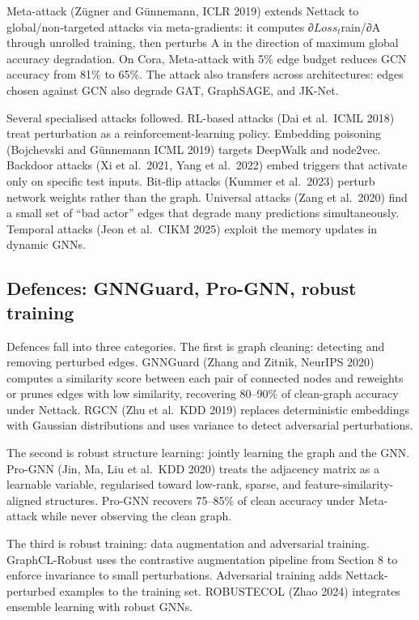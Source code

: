 Meta-attack (Zügner and Günnemann, ICLR 2019) extends Nettack to global/non-targeted attacks via meta-gradients: it computes ∂\(Loss_t\)rain/∂A through unrolled training, then perturbs A in the direction of maximum global accuracy degradation. On Cora, Meta-attack with 5\% edge budget reduces GCN accuracy from 81\% to 65\%. The attack also transfers across architectures: edges chosen against GCN also degrade GAT, GraphSAGE, and JK-Net.

Several specialised attacks followed. RL-based attacks (Dai et al.~ICML 2018) treat perturbation as a reinforcement-learning policy. Embedding poisoning (Bojchevski and Günnemann ICML 2019) targets DeepWalk and node2vec. Backdoor attacks (Xi et al.~2021, Yang et al.~2022) embed triggers that activate only on specific test inputs. Bit-flip attacks (Kummer et al.~2023) perturb network weights rather than the graph. Universal attacks (Zang et al.~2020) find a small set of ``bad actor'' edges that degrade many predictions simultaneously. Temporal attacks (Jeon et al.~CIKM 2025) exploit the memory updates in dynamic GNNs.

\subsection{Defences: GNNGuard, Pro-GNN, robust training}\label{defences-gnnguard-pro-gnn-robust-training}

Defences fall into three categories. The first is graph cleaning: detecting and removing perturbed edges. GNNGuard (Zhang and Zitnik, NeurIPS 2020) computes a similarity score between each pair of connected nodes and reweights or prunes edges with low similarity, recovering 80--90\% of clean-graph accuracy under Nettack. RGCN (Zhu et al.~KDD 2019) replaces deterministic embeddings with Gaussian distributions and uses variance to detect adversarial perturbations.

The second is robust structure learning: jointly learning the graph and the GNN. Pro-GNN (Jin, Ma, Liu et al.~KDD 2020) treats the adjacency matrix as a learnable variable, regularised toward low-rank, sparse, and feature-similarity-aligned structures. Pro-GNN recovers 75--85\% of clean accuracy under Meta-attack while never observing the clean graph.

The third is robust training: data augmentation and adversarial training. GraphCL-Robust uses the contrastive augmentation pipeline from Section 8 to enforce invariance to small perturbations. Adversarial training adds Nettack-perturbed examples to the training set. ROBUSTECOL (Zhao 2024) integrates ensemble learning with robust GNNs.

